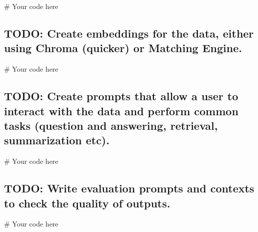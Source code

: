 \documentclass[
  letterpaper,
  DIV=11,
  numbers=noendperiod]{scrreprt}
\newenvironment{Shaded}{\begin{snugshade}}{\end{snugshade}}
\newcommand{\CommentTok}[1]{\textcolor[rgb]{0.37,0.37,0.37}{#1}}
\begin{document}
\begin{Shaded}
\begin{Highlighting}[]
\CommentTok{\# Your code here}
\end{Highlighting}
\end{Shaded}

\hypertarget{todo-create-embeddings-for-the-data-either-using-chroma-quicker-or-matching-engine.}{%
\subsection{TODO: Create embeddings for the data, either using Chroma
(quicker) or Matching
Engine.}\label{todo-create-embeddings-for-the-data-either-using-chroma-quicker-or-matching-engine.}}

\begin{Shaded}
\begin{Highlighting}[]
\CommentTok{\# Your code here}
\end{Highlighting}
\end{Shaded}

\hypertarget{todo-create-prompts-that-allow-a-user-to-interact-with-the-data-and-perform-common-tasks-question-and-answering-retrieval-summarization-etc.}{%
\subsection{TODO: Create prompts that allow a user to interact with the
data and perform common tasks (question and answering, retrieval,
summarization
etc).}\label{todo-create-prompts-that-allow-a-user-to-interact-with-the-data-and-perform-common-tasks-question-and-answering-retrieval-summarization-etc.}}

\begin{Shaded}
\begin{Highlighting}[]
\CommentTok{\# Your code here}
\end{Highlighting}
\end{Shaded}

\hypertarget{todo-write-evaluation-prompts-and-contexts-to-check-the-quality-of-outputs.-1}{%
\subsection{TODO: Write evaluation prompts and contexts to check the
quality of
outputs.}\label{todo-write-evaluation-prompts-and-contexts-to-check-the-quality-of-outputs.-1}}

\begin{Shaded}
\begin{Highlighting}[]
\CommentTok{\# Your code here}
\end{Highlighting}
\end{Shaded}
\end{document}
